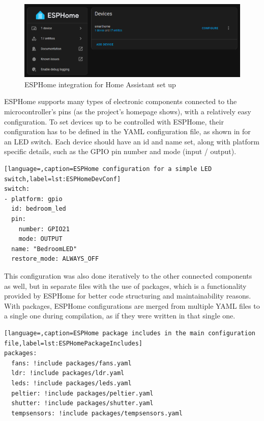 \begin{figure}[!ht]
  \centering
  \includegraphics[width=150mm, keepaspectratio]{figures/homeassistant_esphome_int.png}
  \caption{ESPHome integration for Home Assistant set up}
  \label{fig:HAesphomeint}
\end{figure}

ESPHome supports many types of electronic components connected to the microcontroller's pins (as the project's homepage shows), with a relatively easy configuration. \cite{ESPHomeHomepage} To set devices up to be controlled with ESPHome, their configuration has to be defined in the YAML configuration file, as shown in  for an LED switch. Each device should have an id and name set, along with platform specific details, such as the GPIO pin number and mode (input / output).

\begin{lstlisting}[language=,caption=ESPHome configuration for a simple LED switch,label=lst:ESPHomeDevConf]
switch:
- platform: gpio
  id: bedroom_led
  pin:
    number: GPIO21
    mode: OUTPUT
  name: "BedroomLED"
  restore_mode: ALWAYS_OFF
\end{lstlisting}

This configuration was also done iteratively to the other connected components as well, but in separate files with the use of packages, which is a functionality provided by ESPHome for better code structuring and maintainability reasons. With packages, ESPHome configurations are merged from multiple YAML files to a single one during compilation, as if they were written in that single one.

\begin{lstlisting}[language=,caption=ESPHome package includes in the main configuration file,label=lst:ESPHomePackageIncludes]
packages:
  fans: !include packages/fans.yaml
  ldr: !include packages/ldr.yaml
  leds: !include packages/leds.yaml
  peltier: !include packages/peltier.yaml
  shutter: !include packages/shutter.yaml
  tempsensors: !include packages/tempsensors.yaml
\end{lstlisting}

